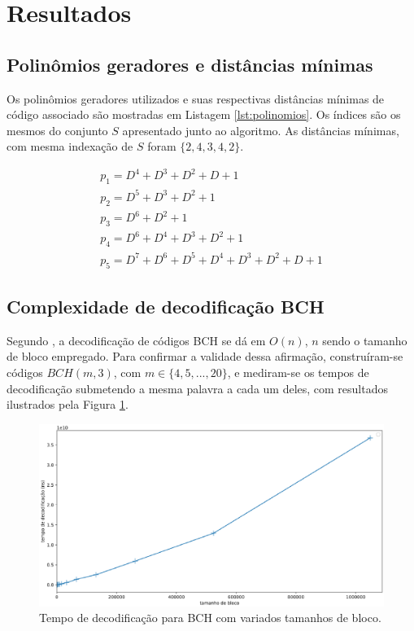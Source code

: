 \section{Resultados}
\subsection{Polinômios geradores e distâncias mínimas}
Os polinômios geradores utilizados e suas respectivas distâncias mínimas de código associado são mostradas em Listagem \ref{lst:polinomios}. Os índices são os mesmos do conjunto $S$ apresentado junto ao algoritmo. As distâncias mínimas, com mesma indexação de $S$ foram $\{2, 4, 3, 4, 2\}$.

\begin{align}
	\nonumber
	p_1 = D^4+D^3+D^2+D+1\\ \nonumber
	p_2 = D^5+D^3+D^2+1\\ \nonumber
	p_3 = D^6+D^2+1\\ \nonumber
	p_4 = D^6+D^4+D^3+D^2+1\\
	p_5 = D^7+D^6+D^5+D^4+D^3+D^2+D+1
	\label{lst:polinomios}
\end{align}

\subsection{\label{complexidade_decod}Complexidade de decodificação BCH}

Segundo \cite{ref:algoritmo-berlekamp}, a decodificação de códigos BCH se dá em $O(n)$, $n$ sendo o tamanho de bloco empregado. Para confirmar a validade dessa afirmação, construíram-se códigos $BCH(m, 3)$, com $m \in \lbrace 4,5,...,20 \rbrace$, e mediram-se os tempos de decodificação submetendo a mesma palavra a cada um deles, com resultados ilustrados pela Figura \ref{fig:bch_decoding_is_linear}.

\begin{figure}[!hb]
	\centering
    \captionsetup{justification=centering}
	\includegraphics[scale=0.3]{floats/bch-decode-is-linear.eps}
	\caption{\label{fig:bch_decoding_is_linear}Tempo de decodificação para BCH com variados tamanhos de bloco.}
\end{figure}